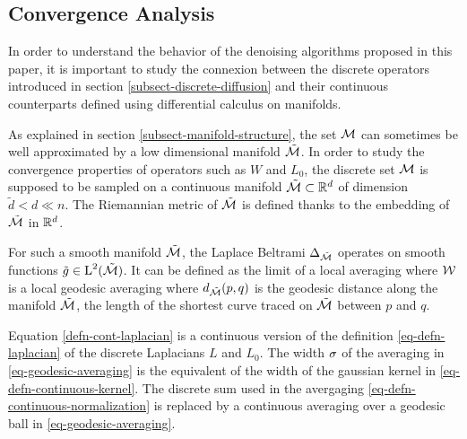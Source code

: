 \documentclass[final]{siamltex}
\begin{document}
\subsection{Convergence Analysis}
\label{subsect-convergence-analysis}

In order to understand the behavior of the denoising algorithms proposed in this paper, it is important to study the connexion between the discrete operators introduced in section \ref{subsect-discrete-diffusion} and their continuous counterparts defined using differential calculus on manifolds.

As explained in section \ref{subsect-manifold-structure}, the set $\mathcal{M}$ can sometimes be well approximated by a low dimensional manifold $\tilde {\mathcal{M}}$. In order to study the convergence properties of operators such as $W$ and $L_0$, the discrete set $\mathcal{M}$ is supposed to be sampled on a continuous manifold $\tilde {\mathcal{M}} \subset \mathbb{R}^{d}$ of dimension $\tilde d < d \ll n$. The Riemannian metric of $\tilde {\mathcal{M}}$ is defined thanks to the embedding of $\tilde {\mathcal{M}}$ in $\mathbb{R}^d$.

For such a smooth manifold $\tilde {\mathcal{M}}$, the Laplace Beltrami $\Delta_{\tilde {\mathcal{M}}}$ operates on smooth functions $\tilde g \in \text{\upshape L}^2(\tilde {\mathcal{M}})$. It can be defined as the limit of a local averaging
where $\mathcal{W}$ is a local geodesic averaging
where $d_{\tilde {\mathcal{M}}}(p,q)$ is the geodesic distance along the manifold $\tilde {\mathcal{M}}$, the length of the shortest curve traced on $\tilde {\mathcal{M}}$ between $p$ and $q$.

Equation \eqref{defn-cont-laplacian} is a continuous version of the definition \eqref{eq-defn-laplacian} of the discrete Laplacians $L$ and $L_0$. The width $\sigma$ of the averaging in \eqref{eq-geodesic-averaging} is the equivalent of the width of the gaussian kernel in \eqref{eq-defn-continuous-kernel}. The discrete sum used in the avergaging \eqref{eq-defn-continuous-normalization} is replaced by a continuous averaging over a geodesic ball in \eqref{eq-geodesic-averaging}.
\end{document}
